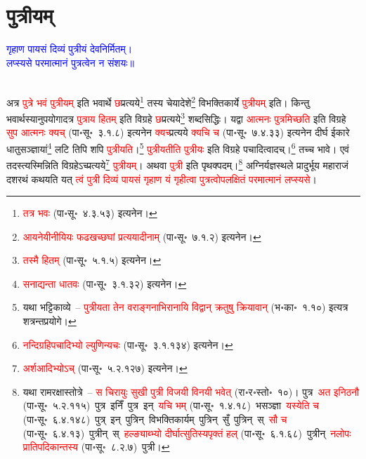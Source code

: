 \section[पुत्रीयम्]{पुत्रीयम्}
\centering\textcolor{blue}{गृहाण पायसं दिव्यं पुत्रीयं देवनिर्मितम्।\nopagebreak\\
लप्स्यसे परमात्मानं पुत्रत्वेन न संशयः॥}\nopagebreak\\
\\
\begin{sloppypar}\justifying\noindent\hspace{10mm} अत्र \textcolor{red}{पुत्रे भवं पुत्रीयम्} इति भवार्थे \textcolor{red}{छ}प्रत्यये\footnote{\textcolor{red}{तत्र भवः} (पा॰सू॰~४.३.५३) इत्यनेन।} तस्य चेयादेशे\footnote{\textcolor{red}{आयनेयीनीयियः फढखच्छघां प्रत्ययादीनाम्‌} (पा॰सू॰~७.१.२) इत्यनेन।} विभक्ति\-कार्ये \textcolor{red}{पुत्रीयम्} इति। किन्तु भवार्थस्यानुपयोगादत्र \textcolor{red}{पुत्राय हितम्} इति विग्रहे \textcolor{red}{छ}\-प्रत्यये\footnote{\textcolor{red}{तस्मै हितम्} (पा॰सू॰~५.१.५) इत्यनेन।} शब्द\-सिद्धिः। यद्वा \textcolor{red}{आत्मनः पुत्रमिच्छति} इति विग्रहे \textcolor{red}{सुप आत्मनः क्यच्} (पा॰सू॰~३.१.८) इत्यनेन \textcolor{red}{क्यच्}प्रत्यये \textcolor{red}{क्यचि च} (पा॰सू॰~७.४.३३) इत्यनेन दीर्घ ईकारे धातु\-सञ्ज्ञायां\footnote{\textcolor{red}{सनाद्यन्ता धातवः} (पा॰सू॰~३.१.३२) इत्यनेन।} लटि तिपि शपि \textcolor{red}{पुत्रीयति}।\footnote{यथा भट्टिकाव्ये~– \textcolor{red}{पुत्रीयता तेन वराङ्गनाभिरानायि विद्वान् क्रतुषु क्रियावान्} (भ॰का॰~१.१०) इत्यत्र शत्रन्त\-प्रयोगे।} \textcolor{red}{पुत्रीयतीति पुत्रीयः} इति विग्रहे पचादित्वादच्।\footnote{\textcolor{red}{नन्दि\-ग्रहि\-पचादिभ्यो ल्युणिन्यचः} (पा॰सू॰~३.१.१३४) इत्यनेन।} तच्च भावे।
एवं तदस्त्यस्मिन्निति विग्रहेऽच्प्रत्यये\footnote{\textcolor{red}{अर्शआदिभ्योऽच्} (पा॰सू॰~५.२.१२७) इत्यनेन।} \textcolor{red}{पुत्रीयम्}। अथवा \textcolor{red}{पुत्री} इति पृथक्पदम्।\footnote{यथा रामरक्षास्तोत्रे~– \textcolor{red}{स चिरायुः सुखी पुत्री विजयी विनयी भवेत्} (रा॰र॰स्तो॰~१०)। पुत्र~\arrow \textcolor{red}{अत इनिठनौ} (पा॰सू॰~५.२.११५)~\arrow पुत्र~इनिँ~\arrow पुत्र~इन्~\arrow \textcolor{red}{यचि भम्} (पा॰सू॰~१.४.१८)~\arrow भसञ्ज्ञा~\arrow \textcolor{red}{यस्येति च} (पा॰सू॰~६.४.१४८)~\arrow पुत्र्~इन्~\arrow पुत्रिन्~\arrow विभक्ति\-कार्यम्~\arrow पुत्रिन्~सुँ~\arrow पुत्रिन्~स्~\arrow \textcolor{red}{सौ च} (पा॰सू॰~६.४.१३)~\arrow पुत्रीन्~स्~\arrow \textcolor{red}{हल्ङ्याब्भ्यो दीर्घात्सुतिस्यपृक्तं हल्} (पा॰सू॰~६.१.६८)~\arrow पुत्रीन्~\arrow \textcolor{red}{नलोपः प्रातिपदिकान्तस्य} (पा॰सू॰~८.२.७)~\arrow पुत्री।} अग्निर्यज्ञ\-स्थले प्रादुर्भूय महाराजं दशरथं कथयति यत् \textcolor{red}{त्वं पुत्री दिव्यं पायसं गृहाण यं गृहीत्वा पुत्रत्वोपलक्षितं परमात्मानं लप्स्यसे}।\end{sloppypar}
